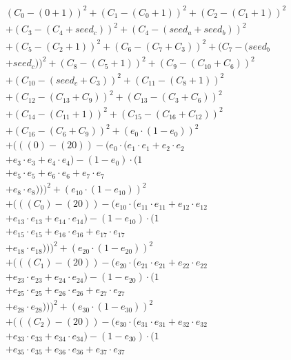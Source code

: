 \documentclass[10pt, a4paper]{article}
\begin{document}
\begin{align*}
& (C_{0} - (0 + 1))^{2} + (C_{1} - (C_{0} + 1))^{2} + (C_{2} - (C_{1} + 1))^{2} \\
& + (C_{3} - (C_{4} + seed_c))^{2} + (C_{4} - (seed_a + seed_b))^{2} \\
& + (C_{5} - (C_{2} + 1))^{2} + (C_{6} - (C_{7} + C_{3}))^{2} + (C_{7} - (seed_b \\
& + seed_c))^{2} + (C_{8} - (C_{5} + 1))^{2} + (C_{9} - (C_{10} + C_{6}))^{2} \\
& + (C_{10} - (seed_c + C_{3}))^{2} + (C_{11} - (C_{8} + 1))^{2} \\
& + (C_{12} - (C_{13} + C_{9}))^{2} + (C_{13} - (C_{3} + C_{6}))^{2} \\
& + (C_{14} - (C_{11} + 1))^{2} + (C_{15} - (C_{16} + C_{12}))^{2} \\
& + (C_{16} - (C_{6} + C_{9}))^{2} + (e_{0} \cdot (1 - e_{0}))^{2} \\
& + (((0) - (20)) - (e_{0} \cdot (e_{1} \cdot e_{1} + e_{2} \cdot e_{2} \\
& + e_{3} \cdot e_{3} + e_{4} \cdot e_{4}) - (1 - e_{0}) \cdot (1 \\
& + e_{5} \cdot e_{5} + e_{6} \cdot e_{6} + e_{7} \cdot e_{7} \\
& + e_{8} \cdot e_{8})))^{2} + (e_{10} \cdot (1 - e_{10}))^{2} \\
& + (((C_{0}) - (20)) - (e_{10} \cdot (e_{11} \cdot e_{11} + e_{12} \cdot e_{12} \\
& + e_{13} \cdot e_{13} + e_{14} \cdot e_{14}) - (1 - e_{10}) \cdot (1 \\
& + e_{15} \cdot e_{15} + e_{16} \cdot e_{16} + e_{17} \cdot e_{17} \\
& + e_{18} \cdot e_{18})))^{2} + (e_{20} \cdot (1 - e_{20}))^{2} \\
& + (((C_{1}) - (20)) - (e_{20} \cdot (e_{21} \cdot e_{21} + e_{22} \cdot e_{22} \\
& + e_{23} \cdot e_{23} + e_{24} \cdot e_{24}) - (1 - e_{20}) \cdot (1 \\
& + e_{25} \cdot e_{25} + e_{26} \cdot e_{26} + e_{27} \cdot e_{27} \\
& + e_{28} \cdot e_{28})))^{2} + (e_{30} \cdot (1 - e_{30}))^{2} \\
& + (((C_{2}) - (20)) - (e_{30} \cdot (e_{31} \cdot e_{31} + e_{32} \cdot e_{32} \\
& + e_{33} \cdot e_{33} + e_{34} \cdot e_{34}) - (1 - e_{30}) \cdot (1 \\
& + e_{35} \cdot e_{35} + e_{36} \cdot e_{36} + e_{37} \cdot e_{37} \\

\end{align*}
\end{document}
